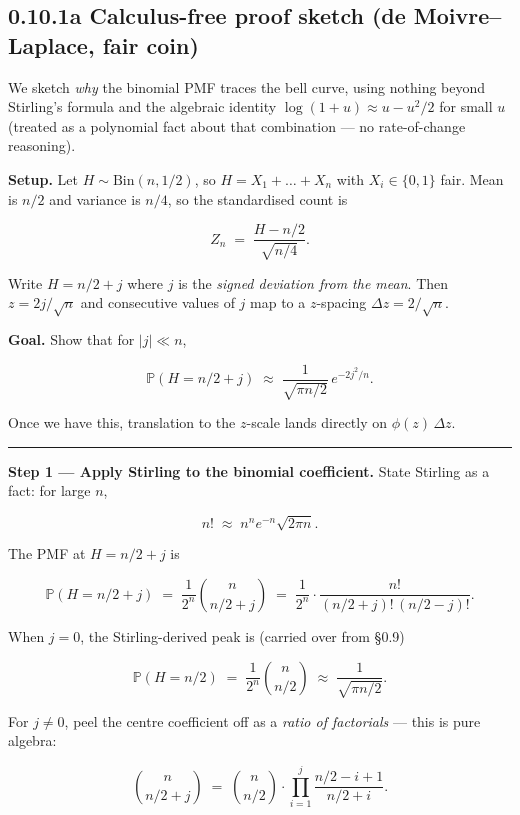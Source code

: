 \documentclass[
  10pt,
  twoside]{book}
\begin{document}
\subsection{0.10.1a Calculus-free proof sketch (de Moivre--Laplace, fair
coin)}\label{a-calculus-free-proof-sketch-de-moivrelaplace-fair-coin}

We sketch \emph{why} the binomial PMF traces the bell curve, using
nothing beyond Stirling's formula and the algebraic identity
\(\log(1 + u) \approx u - u^2/2\) for small \(u\) (treated as a
polynomial fact about that combination --- no rate-of-change reasoning).

\textbf{Setup.} Let \(H \sim \mathrm{Bin}(n, 1/2)\), so
\(H = X_1 + \dots + X_n\) with \(X_i \in \{0, 1\}\) fair. Mean is
\(n/2\) and variance is \(n/4\), so the standardised count is

\[Z_n \;=\; \frac{H - n/2}{\sqrt{n/4}}.\]

Write \(H = n/2 + j\) where \(j\) is the \emph{signed deviation from the
mean}. Then \(z = 2j/\sqrt{n}\) and consecutive values of \(j\) map to a
\(z\)-spacing \(\Delta z = 2/\sqrt{n}\).

\textbf{Goal.} Show that for \(|j| \ll n\),

\[\mathbb{P}(H = n/2 + j) \;\approx\; \frac{1}{\sqrt{\pi n / 2}} \, e^{-2 j^2 / n}.\]

Once we have this, translation to the \(z\)-scale lands directly on
\(\phi(z)\,\Delta z\).

\begin{center}\rule{0.5\linewidth}{0.5pt}\end{center}

\textbf{Step 1 --- Apply Stirling to the binomial coefficient.} State
Stirling as a fact: for large \(n\),

\[n! \;\approx\; n^n e^{-n} \sqrt{2\pi n}.\]

The PMF at \(H = n/2 + j\) is

\[\mathbb{P}(H = n/2 + j) \;=\; \frac{1}{2^n} \binom{n}{n/2 + j} \;=\; \frac{1}{2^n} \cdot \frac{n!}{(n/2 + j)!\,(n/2 - j)!}.\]

When \(j = 0\), the Stirling-derived peak is (carried over from §0.9)

\[\mathbb{P}(H = n/2) \;=\; \frac{1}{2^n}\binom{n}{n/2} \;\approx\; \frac{1}{\sqrt{\pi n / 2}}.\]

For \(j \neq 0\), peel the centre coefficient off as a \emph{ratio of
factorials} --- this is pure algebra:

\[\binom{n}{n/2 + j} \;=\; \binom{n}{n/2} \cdot \prod_{i=1}^{j} \frac{n/2 - i + 1}{n/2 + i}.\]
\end{document}
